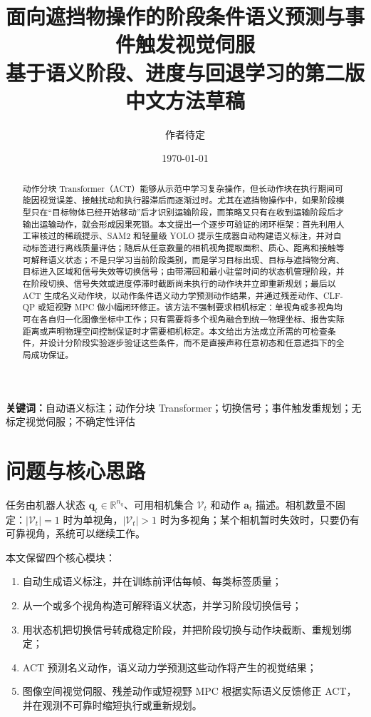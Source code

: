 \documentclass[UTF8,a4paper,11pt]{ctexart}
\title{面向遮挡物操作的阶段条件语义预测与事件触发视觉伺服\\
\large 基于语义阶段、进度与回退学习的第二版中文方法草稿}
\author{作者待定}
\date{\today}
\newcommand{\R}{\mathbb{R}}
\begin{document}
\maketitle

\begin{abstract}
动作分块 Transformer（ACT）能够从示范中学习复杂操作，但长动作块在执行期间可能因视觉误差、接触扰动和执行器滞后而逐渐过时。尤其在遮挡物操作中，如果阶段模型只在“目标物体已经开始移动”后才识别运输阶段，而策略又只有在收到运输阶段后才输出运输动作，就会形成因果死锁。本文提出一个逐步可验证的闭环框架：首先利用人工审核过的稀疏提示、SAM2 和轻量级 YOLO 提示生成器自动构建语义标注，并对自动标签进行离线质量评估；随后从任意数量的相机视角提取面积、质心、距离和接触等可解释语义状态；不是只学习当前阶段类别，而是学习目标出现、目标与遮挡物分离、目标进入区域和信号失效等切换信号；由带滞回和最小驻留时间的状态机管理阶段，并在阶段切换、信号失效或进度停滞时截断尚未执行的动作块并立即重新规划；最后以 ACT 生成名义动作块，以动作条件语义动力学预测动作结果，并通过残差动作、CLF-QP 或短视野 MPC 做小幅闭环修正。该方法不强制要求相机标定：单视角或多视角均可在各自归一化图像坐标中工作；只有需要将多个视角融合到统一物理坐标、报告实际距离或声明物理空间控制保证时才需要相机标定。本文给出方法成立所需的可检查条件，并设计分阶段实验逐步验证这些条件，而不是直接声称任意初态和任意遮挡下的全局成功保证。
\end{abstract}

\noindent\textbf{关键词：}自动语义标注；动作分块 Transformer；切换信号；事件触发重规划；无标定视觉伺服；不确定性评估

\section{问题与核心思路}

任务由机器人状态 $\bm q_t\in\R^{n_q}$、可用相机集合 $\mathcal V_t$ 和动作 $\bm a_t$ 描述。相机数量不固定：$|\mathcal V_t|=1$ 时为单视角，$|\mathcal V_t|>1$ 时为多视角；某个相机暂时失效时，只要仍有可靠视角，系统可以继续工作。

本文保留四个核心模块：
\begin{enumerate}[leftmargin=2.3em]
  \item 自动生成语义标注，并在训练前评估每帧、每类标签质量；
  \item 从一个或多个视角构造可解释语义状态，并学习阶段切换信号；
  \item 用状态机把切换信号转成稳定阶段，并把阶段切换与动作块截断、重规划绑定；
  \item ACT 预测名义动作，语义动力学预测这些动作将产生的视觉结果；
  \item 图像空间视觉伺服、残差动作或短视野 MPC 根据实际语义反馈修正 ACT，并在观测不可靠时缩短执行或重新规划。
\end{enumerate}
\end{document}
